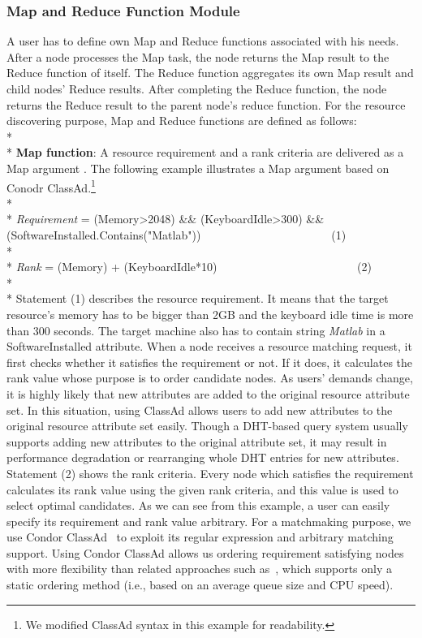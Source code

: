 \documentclass{acm_proc_article-sp}
\begin{document}
\subsubsection{Map and Reduce Function Module}
A user has to define own Map and Reduce functions associated with his needs. 
After a node processes the Map task, the node returns the Map result to the Reduce function of itself.
The Reduce function aggregates its own Map result and child nodes' Reduce results. 
After completing the Reduce function, the node returns the Reduce result to the parent node's reduce function.
For the resource discovering purpose, Map and Reduce functions are defined as follows:\\*\\*
\textbf{Map function}: A resource requirement and a rank criteria are delivered as a Map argument .
The following example illustrates a Map argument based on Conodr ClassAd.\footnote{We modified ClassAd syntax in this example for readability.}\\*\\*
\textit{Requirement} = (Memory>2048) \&\& (KeyboardIdle>300) \&\& (SoftwareInstalled.Contains("Matlab"))\ \ \ \ \ \ \ \ \ \ \ \ \ \ \ \ \ \ \ \ \ \ \ (1)\\*\\*
\textit{Rank} = (Memory) + (KeyboardIdle*10) \ \ \ \ \ \ \ \ \ \ \ \ \ \ \ \ \ \ \ \ \ \ \ \ (2)\\*\\*
Statement (1) describes the resource requirement. It means that the target resource's memory has to be bigger than 2GB and the keyboard idle time is more than 300 seconds.
The target machine also has to contain string \textit{Matlab} in a SoftwareInstalled attribute.
When a node receives a resource matching request, it first checks whether it satisfies the requirement or not. If it does, it calculates the rank value whose purpose is to order candidate nodes.
As users' demands change, it is highly likely that new attributes are added to the original resource attribute set. 
In this situation, using ClassAd allows users to add new attributes to the original resource attribute set easily.
Though a DHT-based query system usually supports adding new attributes to the original attribute set, it may result in performance degradation or rearranging whole DHT entries for new attributes.
Statement (2) shows the rank criteria. Every node which satisfies the requirement calculates its rank value using the given rank criteria, and this value is used to select optimal candidates.
As we can see from this example, a user can easily specify its requirement and rank value arbitrary.
For a matchmaking purpose, we use Condor ClassAd~\cite{classad} to exploit its regular expression and arbitrary matching support.
Using Condor ClassAd allows us ordering requirement satisfying nodes with more flexibility than related approaches such as~\cite{can_query}, which supports only a static ordering method (i.e., based on an average queue size and CPU speed).
\end{document}
